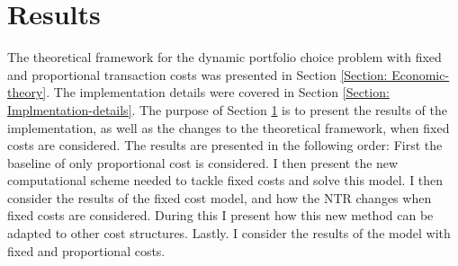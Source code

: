 \documentclass[11pt]{article}
\begin{document}
\fi

\section{Results} \label{Section: Results} 
The theoretical framework for the dynamic portfolio choice problem with fixed and proportional transaction costs was presented in Section \ref{Section: Economic-theory}.
The implementation details were covered in Section \ref{Section: Implmentation-details}. The purpose of Section \ref{Section: Results} is to present the results of the implementation,
as well as the changes to the theoretical framework, when fixed costs are considered. The results are presented in the following order: First the baseline of only proportional cost is considered.
I then present the new computational scheme needed to tackle fixed costs and solve this model. I then consider the results of the fixed cost model, and how the \ac{NTR} changes when fixed costs are considered.
During this I present how this new method can be adapted to other cost structures. Lastly. I consider the results of the model with fixed and proportional costs.
\end{document}
